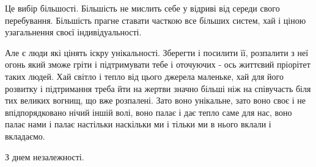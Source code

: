 Це вибір більшості. Більшість не мислить себе у відриві від середи свого
перебування. Більшість прагне ставати часткою все більших систем, хай і ціною
узагальнення своєї індивідуальності.

Але є люди які цінять іскру унікальності. Зберегти і посилити її, розпалити з
неї огонь який зможе гріти і підтримувати тебе і оточуючих - ось життєвий
пріорітет таких людей. Хай світло і тепло від цього джерела маленьке, хай для
його розвитку і підтримання треба йти на жертви значно більші ніж на співучасть
біля тих великих вогнищ, що вже розпалені. Зато воно унікальне, зато воно своє
і не впідпорядковано нічий іншій волі, воно палає і дає тепло саме для нас,
воно палає нами і палає настільки наскільки ми і тільки ми в нього вклали і
вкладаємо. 

З днем незалежності.

